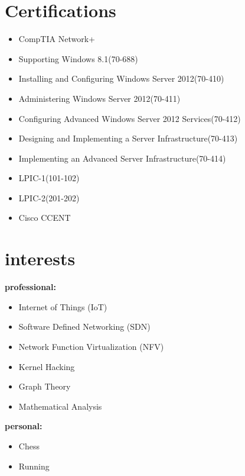 \documentclass[]{friggeri-cv} %
\begin{document}
\section{Certifications}
\begin{itemize}
	\item CompTIA Network+
	\item Supporting Windows 8.1(70-688)
	\item Installing and Configuring Windows Server 2012(70-410)
	\item Administering Windows Server 2012(70-411)
	\item Configuring Advanced Windows Server 2012 Services(70-412)
	\item Designing and Implementing a Server Infrastructure(70-413)
	\item Implementing an Advanced Server Infrastructure(70-414)
	\item LPIC-1(101-102)
	\item LPIC-2(201-202)
	\item Cisco CCENT
\end{itemize}



\section{interests}
\textbf{professional:}
\begin{itemize}
	\item Internet of Things (IoT)
	\item Software Defined Networking (SDN)
	\item Network Function Virtualization (NFV)
	\item Kernel Hacking
	\item Graph Theory
	\item Mathematical Analysis
\end{itemize}
\textbf{personal:}
\begin{itemize}	
	\item Chess
	\item Running
\end{itemize}
\end{document}
